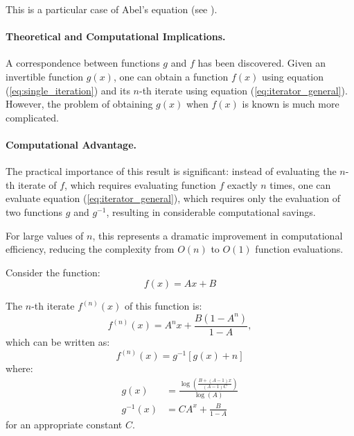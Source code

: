 This is a particular case of Abel's equation (see \cite{KucChoGer:90}).

\paragraph{Theoretical and Computational Implications.}
A correspondence between functions $g$ and $f$ has been discovered. Given an invertible function $g(x)$, one can obtain a function $f(x)$ using equation (\ref{eq:single_iteration}) and its $n$-th iterate using equation (\ref{eq:iterator_general}). However, the problem of obtaining $g(x)$ when $f(x)$ is known is much more complicated.

\paragraph{Computational Advantage.}
The practical importance of this result is significant: instead of evaluating the $n$-th iterate of $f$, which requires evaluating function $f$ exactly $n$ times, one can evaluate equation (\ref{eq:iterator_general}), which requires only the evaluation of two functions $g$ and $g^{-1}$, resulting in considerable computational savings.

For large values of $n$, this represents a dramatic improvement in computational efficiency, reducing the complexity from $O(n)$ to $O(1)$ function evaluations.

\begin{examplebox}
\begin{example}
Consider the function:
\begin{equation}
f(x) = Ax + B
\end{equation}

The $n$-th iterate $f^{(n)}(x)$ of this function is:
\begin{equation}
f^{(n)}(x) = A^n x + \frac{B(1-A^n)}{1-A},
\end{equation}
which can be written as:
\begin{equation}
f^{(n)}(x) = g^{-1}[g(x) + n]
\end{equation}
where:
\begin{align}
g(x) &= \frac{\log\left(\frac{B+(A-1)x}{(A-1)C}\right)}{\log(A)} \\
g^{-1}(x) &= CA^x + \frac{B}{1-A}
\end{align}
for an appropriate constant $C$.
\end{example}
\end{examplebox}


